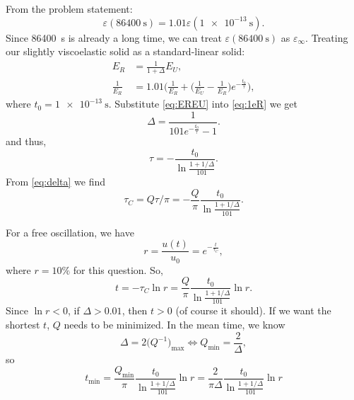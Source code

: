\documentclass[12pt]{article}
\begin{document}
From the problem statement:
\begin{equation}
  \varepsilon(\SI{86400}{\second}) = 1.01 \varepsilon(\SI{1e-13}{\second}).
\end{equation}
Since \SI{86400}{\second} is already a long time, we can treat $\varepsilon(\SI{86400}{\second})$ as $\varepsilon_\infty$.
Treating our slightly viscoelastic solid as a standard-linear solid:
\begin{align}
  E_R               & = \frac{ 1 }{ 1 + \Delta } E_U, \label{eq:EREU}                                                                                      \\
  \frac{ 1 }{ E_R } & = 1.01 \bigg( \frac{ 1 }{ E_R } + \Big( \frac{ 1 }{ E_U } - \frac{ 1 }{ E_R } \Big) e^{-\frac{ t_0 }{ \tau }} \bigg), \label{eq:1eR}
\end{align}
where $t_0 = \SI{1e-13}{\second}$.
Substitute \eqref{eq:EREU} into \eqref{eq:1eR} we get
\begin{equation}
  \Delta = \frac{ 1 }{ 101 e^{-\frac{ t_0 }{ \tau }} - 1}.
\end{equation}
and thus,
\begin{equation}\label{eq:delta}
  \tau = -\frac{ t_0 }{ \ln \frac{ 1 + 1 / \Delta }{ 101 } }.
\end{equation}
From \eqref{eq:delta} we find
\begin{equation}
  \tau_C = Q \tau / \pi = -\frac{ Q }{ \pi } \frac{ t_0 }{ \ln \frac{ 1 + 1 / \Delta }{ 101 } }.
\end{equation}

For a free oscillation, we have
\begin{equation}
  r = \frac{ u(t) }{ u_0 } = e^{-\frac{ t }{ \tau_C }},
\end{equation}
where $r = 10\%$ for this question.
So,
\begin{equation}
  t = -\tau_C \ln r = \frac{ Q }{ \pi } \frac{ t_0 }{ \ln \frac{ 1 + 1 / \Delta }{ 101 } } \ln r.
\end{equation}
Since $\ln r < 0$, if $\Delta > 0.01$, then $t > 0$ (of course it should).
If we want the shortest $t$, $Q$ needs to be minimized.
In the mean time, we know
\begin{equation}
  \Delta = 2 \big( Q^{-1} \big)_\text{max} \Leftrightarrow Q_\text{min} = \frac{ 2 }{ \Delta },
\end{equation}
so
\begin{equation}
  t_\text{min} = \frac{ Q_\text{min} }{ \pi } \frac{ t_0 }{ \ln \frac{ 1 + 1 / \Delta }{ 101 } } \ln r
  = \frac{ 2 }{ \pi \Delta } \frac{ t_0 }{ \ln \frac{ 1 + 1 / \Delta }{ 101 } } \ln r
\end{equation}
\end{document}
